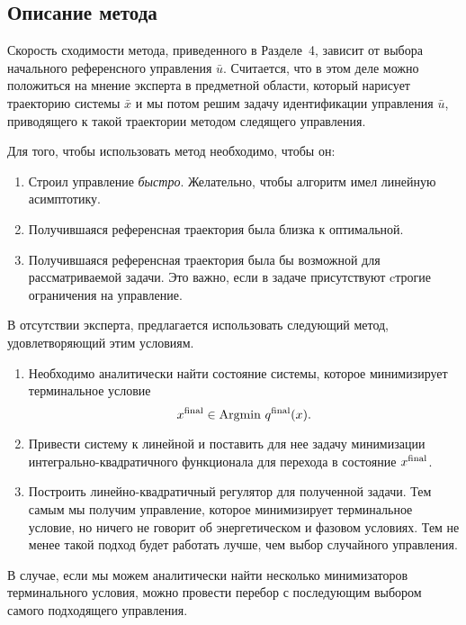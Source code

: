 \documentclass[../../doc.tex]{subfiles}
\begin{document}
    \subsection{Описание метода}

    Скорость сходимости метода, приведенного в Разделе~4, зависит от выбора начального референсного управления $\bar u$.
    Считается, что в этом деле можно положиться на мнение эксперта в предметной области, который нарисует траекторию системы $\bar x$ и мы потом решим задачу идентификации управления $\bar u$, приводящего к такой траектории методом следящего управления.

    Для того, чтобы использовать метод необходимо, чтобы он:
    \begin{enumerate}\itemsep0em
        \item Строил управление \textit{быстро}. Желательно, чтобы алгоритм имел линейную асимптотику.
        \item Получившаяся референсная траектория была близка к оптимальной.
        \item Получившаяся референсная траектория была бы возможной для рассматриваемой задачи. Это важно, если в задаче присутствуют cтрогие ограничения на управление.
    \end{enumerate}
    
    В отсутствии эксперта, предлагается использовать следующий метод, удовлетворяющий этим условиям.
    \begin{enumerate}
        \item Необходимо аналитически найти состояние системы, которое минимизирует терминальное условие
        $$
            x^{\textnormal{final}} \in \textnormal{Argmin } q^{\textnormal{final}}(x).
        $$
        \item Привести систему к линейной и поставить для нее задачу минимизации интегрально-квадратичного функционала для перехода в состояние $x^{\textnormal{final}}$.
        \item Построить линейно-квадратичный регулятор для полученной задачи. Тем самым мы получим управление, которое минимизирует терминальное условие, но ничего не говорит об энергетическом и фазовом условиях. Тем не менее такой подход будет работать лучше, чем выбор случайного управления.
    \end{enumerate}
    В случае, если мы можем аналитически найти несколько минимизаторов терминального условия, можно провести перебор с последующим выбором самого подходящего управления.

    \ifSubfilesClassLoaded{
        \nocite{*}
        \clearpage
        
        
    }{}
\end{document}
